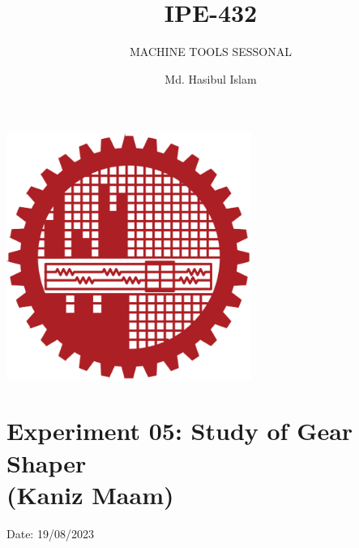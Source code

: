 \documentclass{article}
\title{IPE-432}
\author{Md. Hasibul Islam}
\subtitle{MACHINE TOOLS SESSONAL}
\begin{document}
\begin{titlepage}
    \centering
    
    {\Huge\bfseries\maketitle}
    \vspace{2cm}
    \includegraphics[width=8cm]{institution_logo.jpg}
    \vfill
    \vspace*{2cm}
\end{titlepage}

\tableofcontents 
\hrulefill

\section{Experiment 05: Study of Gear Shaper\\ (Kaniz Maam)} 
\hfill Date: 19/08/2023
\end{document}
